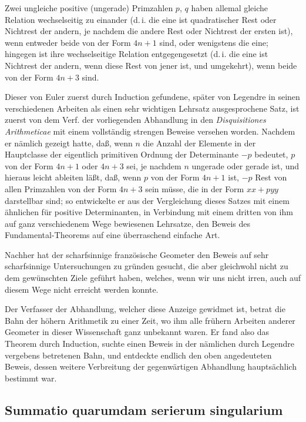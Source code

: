 \documentclass[12pt,a4paper]{article}
\theoremstyle{plain}
\theoremstyle{definition}
\theoremstyle{remark}
\begin{document}
Zwei ungleiche positive (ungerade) Primzahlen $p$, $q$ haben allemal gleiche Relation wechselseitig zu einander (d.\,i. die eine ist quadratischer Rest oder Nichtrest der andern, je nachdem die andere Rest oder Nichtrest der ersten ist), wenn entweder beide von der Form $4n+1$ sind, oder wenigstens die eine; hingegen ist ihre wechselseitige Relation entgegengesetzt (d.\,i. die eine ist Nichtrest der andern, wenn diese Rest von jener ist, und umgekehrt), wenn beide von der Form $4n+3$ sind.

Dieser von Euler zuerst durch Induction gefundene, später von Legendre in seinen verschiedenen Arbeiten als einen sehr wichtigen Lehrsatz ausgesprochene Satz, ist zuerst von dem Verf. der vorliegenden Abhandlung in den \textit{Disquisitiones Arithmeticae} mit einem vollständig strengen Beweise versehen worden. Nachdem er nämlich gezeigt hatte, daß, wenn $n$ die Anzahl der Elemente in der Hauptclasse der eigentlich primitiven Ordnung der Determinante $-p$ bedeutet, $p$ von der Form $4n+1$ oder $4n+3$ sei, je nachdem $n$ ungerade oder gerade ist, und hieraus leicht ableiten läßt, daß, wenn $p$ von der Form $4n+1$ ist, $-p$ Rest von allen Primzahlen von der Form $4n+3$ sein müsse, die in der Form $xx+pyy$ darstellbar sind; so entwickelte er aus der Vergleichung dieses Satzes mit einem ähnlichen für positive Determinanten, in Verbindung mit einem dritten von ihm auf ganz verschiedenem Wege bewiesenen Lehrsatze, den Beweis des Fundamental-Theorems auf eine überraschend einfache Art.

Nachher hat der scharfsinnige französische Geometer den Beweis auf sehr scharfsinnige Untersuchungen zu gründen gesucht, die aber gleichwohl nicht zu dem gewünschten Ziele geführt haben, welches, wenn wir uns nicht irren, auch auf diesem Wege nicht erreicht werden konnte.

Der Verfasser der Abhandlung, welcher diese Anzeige gewidmet ist, betrat die Bahn der höhern Arithmetik zu einer Zeit, wo ihm alle frühern Arbeiten anderer Geometer in dieser Wissenschaft ganz unbekannt waren. Er fand also das Theorem durch Induction, suchte einen Beweis in der nämlichen durch Legendre vergebens betretenen Bahn, und entdeckte endlich den oben angedeuteten Beweis, dessen weitere Verbreitung der gegenwärtigen Abhandlung hauptsächlich bestimmt war.

\subsection*{Summatio quarumdam serierum singularium}
\end{document}
